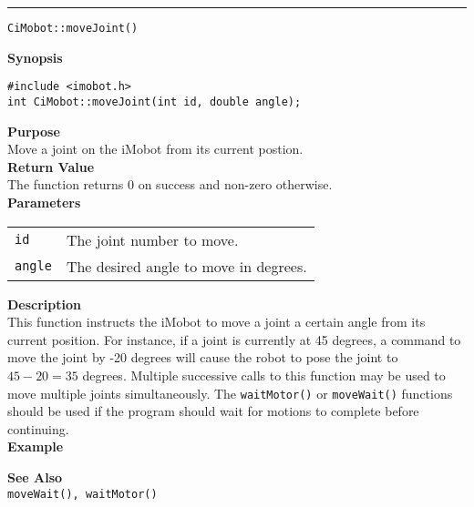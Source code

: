\noindent
\vspace{5pt}
\rule{6.5in}{0.015in}
\noindent
{\LARGE \texttt{CiMobot::moveJoint()}}\\
{}

\noindent
{\bf Synopsis}\\
\begin{verbatim}
#include <imobot.h>
int CiMobot::moveJoint(int id, double angle);
\end{verbatim}

\noindent
{\bf Purpose}\\
Move a joint on the iMobot from its current postion.\\

\noindent
{\bf Return Value}\\
The function returns 0 on success and non-zero otherwise.\\

\noindent
{\bf Parameters}
\vspace{-0.1in}
\begin{description}
\item               
\begin{tabular}{p{10 mm}p{145 mm}}
\texttt{id} & The joint number to move. \\
\texttt{angle} & The desired angle to move in degrees.
\end{tabular}
\end{description}

\noindent
{\bf Description}\\
This function instructs the iMobot to move a joint a certain angle from its current position.
For instance, if a joint is currently at 45 degrees, a command to move the joint by -20 degrees will cause the robot to pose the joint to $45-20 = 35$ degrees.
Multiple successive calls to this function may be used to move multiple joints
simultaneously. The \texttt{waitMotor()} or \texttt{moveWait()} functions should
be used if the program should wait for motions to complete before continuing. \\

\noindent
{\bf Example}\\
\noindent

\noindent
{\bf See Also}\\
\texttt{moveWait(), waitMotor()}

